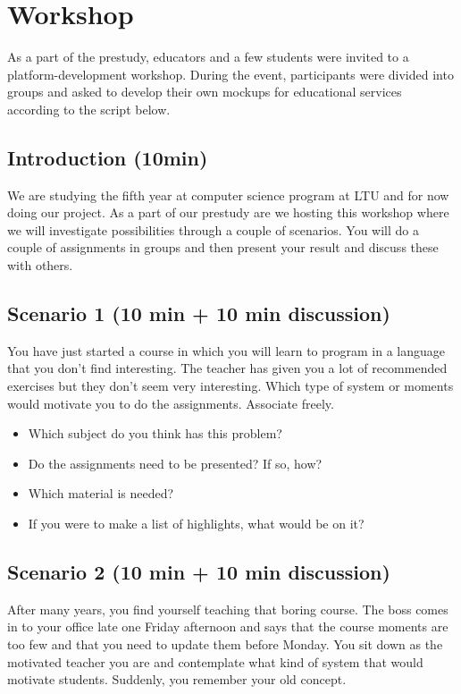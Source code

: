 \chapter{Workshop}
As a part of the prestudy, educators and a few students were invited to a platform-development workshop. During the event, participants were divided into groups and asked to develop their own mockups for educational services according to the script below.

\section*{Introduction (10min)}
We are studying the fifth year at computer science program at LTU and for now doing our project. As a part of our prestudy are we hosting this workshop where we will investigate possibilities through a couple of scenarios. You will do a couple of assignments in groups and then present your result and discuss these with others.

\section*{Scenario 1 (10 min + 10 min discussion)}
You have just started a course in which you will learn to program in a language that you don't find interesting. The teacher has given you a lot of recommended exercises but they don't seem very interesting. Which type of system or moments would motivate you to do the assignments. Associate freely.
\begin{itemize}
\item Which subject do you think has this problem?
\item Do the assignments need to be presented? If so, how?
\item Which material is needed?
\item If you were to make a list of highlights, what would be on it?
\end{itemize} 

\section*{Scenario 2 (10 min + 10 min discussion)}
After many years, you find yourself teaching that boring course. The boss comes in to your office late one Friday afternoon and says that the course moments are too few and that you need to update them before Monday. You sit down as the motivated teacher you are and contemplate what kind of system that would motivate students. Suddenly, you remember your old concept.

